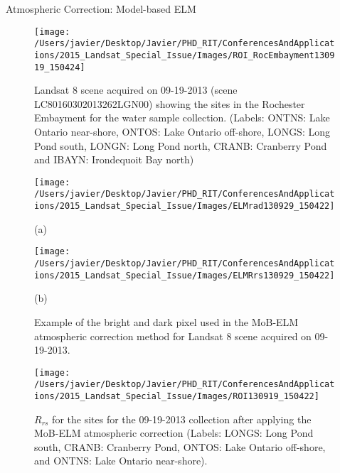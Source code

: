 \documentclass{beamer}
\begin{document}
\begin{frame}{}
\begin{columns}[t]
\begin{column}{.3\linewidth}
\begin{block}{Atmospheric Correction: Model-based ELM}
\begin{figure}[htb]
  \centering
  \texttt{[image: /Users/javier/Desktop/Javier/PHD\_RIT/ConferencesAndApplications/2015\_Landsat\_Special\_Issue/Images/ROI\_RocEmbayment130919\_150424]}
  \caption{Landsat 8 scene acquired on 09-19-2013 (scene LC80160302013262LGN00) showing the sites in the Rochester Embayment for the water sample collection. (Labels: ONTNS: Lake Ontario near-shore, ONTOS: Lake Ontario off-shore, LONGS: Long Pond south, LONGN: Long Pond north, CRANB: Cranberry Pond and IBAYN: Irondequoit Bay north)\label{fig:091913Sites} } 
\end{figure}

\begin{figure}[htb]
  \begin{minipage}[c]{0.40\linewidth}
    \centering
      \texttt{[image: /Users/javier/Desktop/Javier/PHD\_RIT/ConferencesAndApplications/2015\_Landsat\_Special\_Issue/Images/ELMrad130929\_150422]}\\
    \centerline{(a)}\medskip
  \end{minipage}
  \hspace{1cm}
  \begin{minipage}[d]{0.40\linewidth}
    \centering
      \texttt{[image: /Users/javier/Desktop/Javier/PHD\_RIT/ConferencesAndApplications/2015\_Landsat\_Special\_Issue/Images/ELMRrs130929\_150422]}\\
    \centerline{(b)}\medskip
  \end{minipage}
  \caption{Example of the bright and dark pixel used in the MoB-ELM atmospheric correction method for Landsat 8 scene acquired on 09-19-2013.\label{fig:MOBELMpxls} } 
\end{figure}

\begin{figure}[htbp!]
  \centering
  \texttt{[image: /Users/javier/Desktop/Javier/PHD\_RIT/ConferencesAndApplications/2015\_Landsat\_Special\_Issue/Images/ROI130919\_150422]}
  \caption{$R_{rs}$ for the sites for the 09-19-2013 collection after applying the MoB-ELM atmospheric correction (Labels: LONGS: Long Pond south, CRANB: Cranberry Pond, ONTOS: Lake Ontario off-shore, and ONTNS: Lake Ontario near-shore).\label{fig:RrsROIs130919} } 
\end{figure}
\vspace{-.2cm}
\end{block}



\end{column}
\end{columns}
\end{frame}
\end{document}
